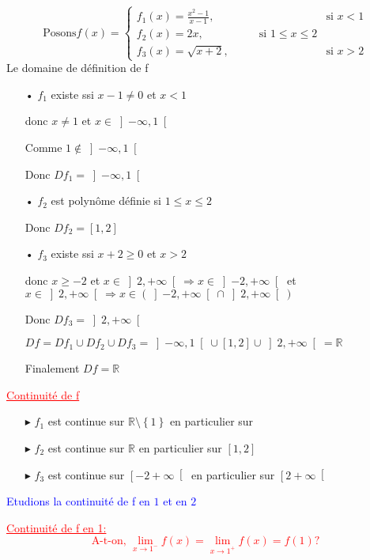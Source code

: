 \documentclass[12pt]{article}
\begin{document}
\[\text{Posons} f(x) = \begin{cases} 
  f_{1}(x)=\frac{x^2-1}{x-1}, & \text{si } x < 1 \\
   f_{2}(x)=2x,\quad\quad\quad\quad\quad \text{si } 1 \leq x \leq 2\\
  f_{3}(x)=\sqrt{x+2}, & \text{si } x > 2
\end{cases} \]
Le domaine de définition de f
\begin{itemize}
\item[•] $f_{1}$ existe ssi  $x-1\neq0$ et $x < 1$

donc $x\neq 1$ et $x \in \left] -\infty, 1\right[$

Comme  $1 \notin \left] -\infty, 1\right[$

Donc $Df_{1}=\left] -\infty, 1\right[$
\item[•] $f_{2}$ est polynôme définie si $1 \leq x \leq 2$

Donc $Df_{2}=\left[  1, 2\right] $
\item[•] $f_{3}$ existe ssi $x+2\geq 0$ et $x > 2$

donc $x\geq -2$ et $x \in \left]2, +\infty\right[  \Rightarrow x \in\left]-2, +\infty\right[$ et $x \in \left]2, +\infty\right[ \Rightarrow x\in (\left]-2, +\infty\right[\cap\left]2, +\infty\right[)$

Donc $Df_{3}=\left]2, +\infty\right[ $

$Df=Df_{1} \cup Df_{2} \cup Df_{3}=\left]-\infty, 1\right[\cup\left[  1, 2\right] \cup\left]2, +\infty\right[=\mathbb{R}$

Finalement $Df=\mathbb{R}$
\end{itemize}

\textcolor{red}{\underline{Continuité de f}}
\begin{itemize}
\item[$\blacktriangleright$] $f_{1}$ est continue sur $\mathbb{R}\setminus\left\lbrace 1 \right\rbrace $ en particulier sur 
\item[$\blacktriangleright$] $f_{2}$ est continue sur $\mathbb{R}$ en particulier sur $\left[  1, 2\right] $
\item[$\blacktriangleright$] $f_{3}$ est continue sur $\left[-2 +\infty \right[  $ en particulier sur $\left[2 +\infty \right[$
\end{itemize}
\textcolor{blue}{Etudions la continuité de f en $1$ et en $2$}

\textcolor{red}{\underline{Continuité de f en 1:}}
\textcolor{red}{\[\text{A-t-on, } \lim_{x \to 1^{-}}f(x)=\lim_{x \to 1^{+}}f(x)=f(1) ?\]}
\end{document}
